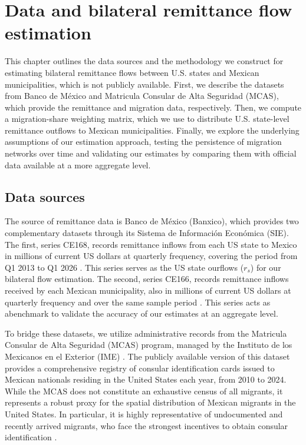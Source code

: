 \chapter{Data and bilateral remittance flow estimation}

This chapter outlines the data sources and the methodology we construct for estimating bilateral remittance flows between U.S. states and Mexican municipalities, which is not publicly available. First, we describe the datasets from Banco de México and Matricula Consular de Alta Seguridad (MCAS), which provide the remittance and migration data, respectively. Then, we compute a migration-share weighting matrix, which we use to distribute U.S. state-level remittance outflows to Mexican municipalities. Finally, we explore the underlying assumptions of our estimation approach, testing the persistence of migration networks over time and validating our estimates by comparing them with official data available at a more aggregate level.

\section{Data sources}

The source of remittance data is Banco de México (Banxico), which provides two complementary datasets through its Sistema de Información Económica (SIE). The first, series CE168, records remittance inflows from each US state to Mexico in millions of current US dollars at quarterly frequency, covering the period from Q1 2013 to Q1 2026 \parencite{banxico_ce168}. This series serves as the US state ourflows ($r_s$) for our bilateral flow estimation. The second, series CE166, records remittance inflows received by each Mexican municipality, also in millions of current US dollars at quarterly frequency and over the same sample period \parencite{banxico_ce166}. This series acts as abenchmark to validate the accuracy of our estimates at an aggregate level.

\par

To bridge these datasets, we utilize administrative records from the Matricula Consular de Alta Seguridad (MCAS) program, managed by the Instituto de los Mexicanos en el Exterior (IME) \parencite{ime_estadisticas_2026}. The publicly available version of this dataset provides a comprehensive registry of consular identification cards issued to Mexican nationals residing in the United States each year, from 2010 to 2024. While the MCAS does not constitute an exhaustive census of all migrants, it represents a robust proxy for the spatial distribution of Mexican migrants in the United States. In particular, it is highly representative of undocumented and recently arrived migrants, who face the strongest incentives to obtain consular identification \parencite{caballero_cadena_kovak_2018}. 

